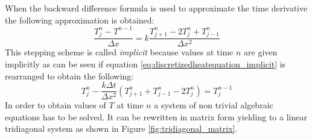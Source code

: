 When the backward difference formula is used to approximate the time derivative the following approximation is obtained:
 \begin{equation}
  \frac{T^{n}_{j} - T^{n-1}_{}}{\Delta x} = k \frac{T^n_{j+1}- 2T^n_{j} + T^n_{j-1}}{\Delta x^2}
 \label{eq:discretizedheatequation_implicit}
 \end{equation}
 This stepping scheme is called \textit{implicit} because values at time $n$ are given implicitly as can be seen if equation \ref{eq:discretizedheatequation_implicit} is rearranged to obtain the following: 
 \begin{equation}
T^n_{j} - \frac{k \Delta t}{\Delta x^2} (T^n_{j+1}+T^n_{j-1}-2T^n_{j}) =   T^{n-1}_{j}
 \label{eq:discretizedheatequation1}
 \end{equation}
 In order to obtain values of $T$ at time $n$ a system of non trivial algebraic equations has to be solved. 
 It can be rewritten in matrix form yielding to a linear tridiagonal system as shown in Figure \ref{fig:tridiagonal_matrix}.

